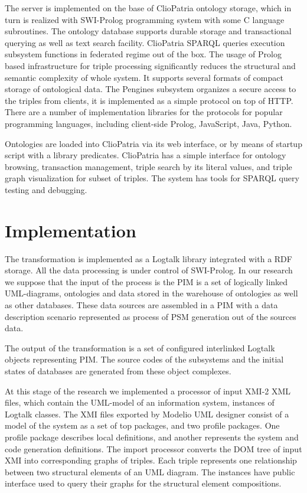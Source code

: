 \documentclass[conference,a4paper]{IEEEtran}
\begin{document}
The server is implemented on the base of ClioPatria ontology storage, which in turn is realized with SWI-Prolog programming system with some C language subroutines.  The ontology database supports durable storage and transactional querying as well as text search facility.  ClioPatria SPARQL queries execution subsystem functions in federated regime out of the box.  The usage of Prolog based infrastructure for triple processing significantly reduces the structural and semantic complexity of whole system. It supports several formats of compact storage of ontological data.  The Pengines subsystem organizes a secure access to the triples from clients, it is implemented as a simple protocol on top of HTTP.  There are a number of implementation libraries for the protocols for popular programming languages, including client-side Prolog, JavaScript, Java, Python.

Ontologies are loaded into ClioPatria via its web interface, or by means of startup script with a library predicates.  ClioPatria has a simple interface for ontology browsing, transaction management, triple search by its literal values, and triple graph visualization for subset of triples.  The system has tools for SPARQL query testing and debugging.

\section{Implementation}
\label{sec:impl}

The transformation is implemented as a Logtalk library integrated with a RDF storage.  All the data processing is under control of SWI-Prolog.  In our research we suppose that the input of the process is the PIM is a set of logically linked UML-diagrams, ontologies and data stored in the warehouse of ontologies as well as other databases.  These data sources are assembled in a PIM with a data description scenario represented as process of PSM generation out of the sources data.

The output of the transformation is a set of configured interlinked Logtalk objects representing PIM.  The source codes of the subsystems and the initial states of databases are generated from these object complexes.

At this stage of the research we implemented a processor of input XMI-2 XML files, which contain the UML-model of an information system, instances of Logtalk classes.  The XMI files exported by Modelio UML designer consist of a model of the system as a set of top packages, and two profile packages.  One profile package describes local definitions, and another represents the system and code generation definitions.  The import processor converts the DOM tree of input XMI into corresponding graphs of triples.  Each triple represents one relationship between two structural elements of an UML diagram.  The instances have public interface used to query their graphs for the structural element compositions.
\end{document}
